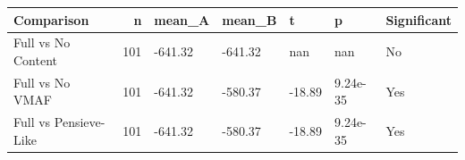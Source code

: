 \begin{tabular}{lrlllll}
\toprule
Comparison & n & mean_A & mean_B & t & p & Significant \\
\midrule
Full vs No Content & 101 & -641.32 & -641.32 & nan & nan & No \\
Full vs No VMAF & 101 & -641.32 & -580.37 & -18.89 & 9.24e-35 & Yes \\
Full vs Pensieve-Like & 101 & -641.32 & -580.37 & -18.89 & 9.24e-35 & Yes \\
\bottomrule
\end{tabular}
